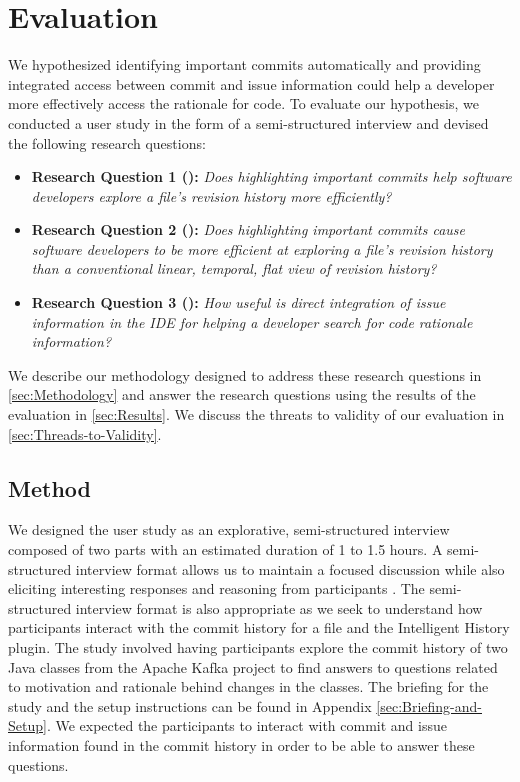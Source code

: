 \chapter{Evaluation}
\label{ch:Evaluation}

We hypothesized identifying important commits automatically and providing integrated access between commit and issue information could help a developer more effectively access the rationale for code.
To evaluate our hypothesis, we conducted a user study in the form of a semi-structured interview and devised the following research questions:

\begin{itemize}[leftmargin=*]
    \item[] \label{itm:RQ1} \textbf{Research Question 1 ():} \textit{Does highlighting important commits help software developers explore a file’s revision history more efficiently?}
    \item[] \label{itm:RQ2} \textbf{Research Question 2 ():} \textit{Does highlighting important commits cause software developers to be more efficient at exploring a file’s revision history than a conventional linear, temporal, flat view of revision history?}
    \item[] \label{itm:RQ3} \textbf{Research Question 3 ():} \textit{How useful is direct integration of issue information in the IDE for helping a developer search for code rationale information?}
  \end{itemize}

We describe our methodology designed to address these research questions in \autoref{sec:Methodology} and answer the research questions using the results of the evaluation in \autoref{sec:Results}.
We discuss the threats to validity of our evaluation in \autoref{sec:Threads-to-Validity}.

\section{Method}
\label{sec:Methodology}

We designed the user study as an explorative, semi-structured interview composed of two parts with an estimated duration of 1 to 1.5 hours.
A semi-structured interview format allows us to maintain a focused discussion while also eliciting interesting responses and reasoning from participants \cite{shull_guide_2007}.
The semi-structured interview format is also appropriate as we seek to understand how participants interact with the commit history for a file and the Intelligent History plugin.
The study involved having participants explore the commit history of two Java classes from the Apache Kafka project to find answers to questions related to motivation and rationale behind changes in the classes.
The briefing for the study and the setup instructions can be found in Appendix \ref{sec:Briefing-and-Setup}.
We expected the participants to interact with commit and issue information found in the commit history in order to be able to answer these questions.

